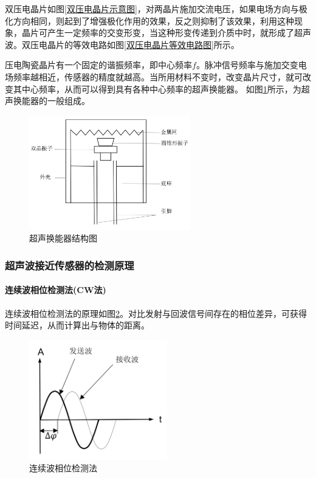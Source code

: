     双压电晶片如图\ref{双压电晶片示意图}，对两晶片施加交流电压，如果电场方向与极化方向相同，则起到了增强极化作用的效果，反之则抑制了该效果，利用这种现象，晶片可产生一定频率的交变形变，当这种形变传递到介质中时，就形成了超声波。双压电晶片的等效电路如图\ref{双压电晶片等效电路图}所示。\par

    压电陶瓷晶片有一个固定的谐振频率，即中心频率$f$。脉冲信号频率与施加交变电场频率越相近，传感器的精度就越高。当所用材料不变时，改变晶片尺寸，就可改变其中心频率，从而可以得到具有各种中心频率的超声换能器。
    如图\ref{超声换能器结构图}所示，为超声换能器的一般组成。
    \begin{figure}[!h]
    	\centering
    	\includegraphics[width=7cm]{figure/超声换能器结构图.png}
    	\caption{超声换能器结构图}
    	\label{超声换能器结构图}
    \end{figure}
\newpage
    \subsubsection{超声波接近传感器的检测原理}
    \paragraph{连续波相位检测法(CW法) }
    连续波相位检测法的原理如图\ref{连续波相位检测法}。对比发射与回波信号间存在的相位差异，可获得时间延迟，从而计算出与物体的距离。\par
    \begin{figure}[!h]
    	\centering
    	\includegraphics[width=6cm]{figure/连续波相位检测法.png}
    	\caption{连续波相位检测法}
    	\label{连续波相位检测法}
    \end{figure}\par


